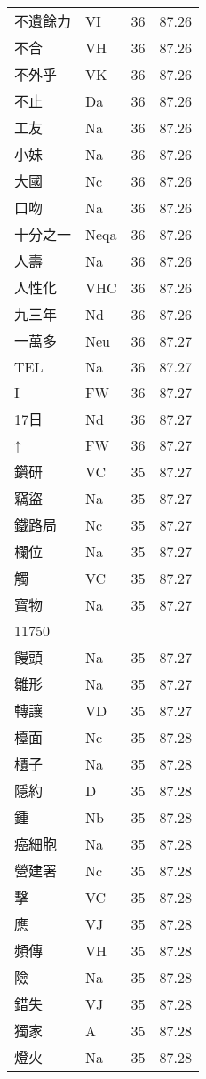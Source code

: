 \documentclass[twocolumn]{book}
\begin{document}
\begin{supertabular}{llrr}
不遺餘力 & VI & 36 &  87.26\\
不合 & VH & 36 &  87.26\\
不外乎 & VK & 36 &  87.26\\
不止 & Da & 36 &  87.26\\
工友 & Na & 36 &  87.26\\
小妹 & Na & 36 &  87.26\\
大國 & Nc & 36 &  87.26\\
口吻 & Na & 36 &  87.26\\
十分之一 & Neqa & 36 &  87.26\\
人壽 & Na & 36 &  87.26\\
人性化 & VHC & 36 &  87.26\\
九三年 & Nd & 36 &  87.26\\
一萬多 & Neu & 36 &  87.27\\
TEL & Na & 36 &  87.27\\
I & FW & 36 &  87.27\\
17日 & Nd & 36 &  87.27\\
↑ & FW & 36 &  87.27\\
鑽研 & VC & 35 &  87.27\\
竊盜 & Na & 35 &  87.27\\
鐵路局 & Nc & 35 &  87.27\\
欄位 & Na & 35 &  87.27\\
觸 & VC & 35 &  87.27\\
寶物 & Na & 35 &  87.27\\
11750\\
饅頭 & Na & 35 &  87.27\\
雛形 & Na & 35 &  87.27\\
轉讓 & VD & 35 &  87.27\\
檯面 & Nc & 35 &  87.28\\
櫃子 & Na & 35 &  87.28\\
隱約 & D & 35 &  87.28\\
鍾 & Nb & 35 &  87.28\\
癌細胞 & Na & 35 &  87.28\\
營建署 & Nc & 35 &  87.28\\
擊 & VC & 35 &  87.28\\
應 & VJ & 35 &  87.28\\
頻傳 & VH & 35 &  87.28\\
險 & Na & 35 &  87.28\\
錯失 & VJ & 35 &  87.28\\
獨家 & A & 35 &  87.28\\
燈火 & Na & 35 &  87.28\\

\end{supertabular}
\end{document}
